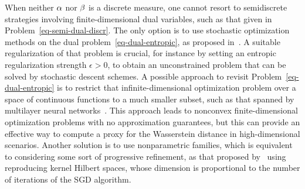 \begin{rem}\label{rem-sgd-cont-cont}
When neither $\alpha$ nor $\beta$ is a discrete measure, one cannot resort to semidiscrete strategies involving finite-dimensional dual variables, such as that given in Problem~\eqref{eq-semi-dual-discr}. The only option is to use stochastic optimization methods on the dual problem~\eqref{eq-dual-entropic}, as proposed in~\citep{genevay2016stochastic}. A suitable regularization of that problem is crucial, for instance by setting an entropic regularization strength $\epsilon>0$, to obtain an unconstrained problem that can be solved by stochastic descent schemes.
%
A possible approach to revisit Problem~\eqref{eq-dual-entropic} is to restrict that infinite-dimensional optimization problem over a space of continuous functions to a much smaller subset, such as that spanned by multilayer neural networks~\citep{seguy2018large}. This approach leads to nonconvex finite-dimensional optimization problems with no approximation guarantees, but this can provide an effective way to compute a proxy for the Wasserstein distance in high-dimensional scenarios.
%
Another solution is to use nonparametric families, which is equivalent to considering some sort of progressive refinement, as that proposed by~\citet{genevay2016stochastic} using reproducing kernel Hilbert spaces, whose dimension is proportional to the number of iterations of the SGD algorithm. 
\end{rem}
